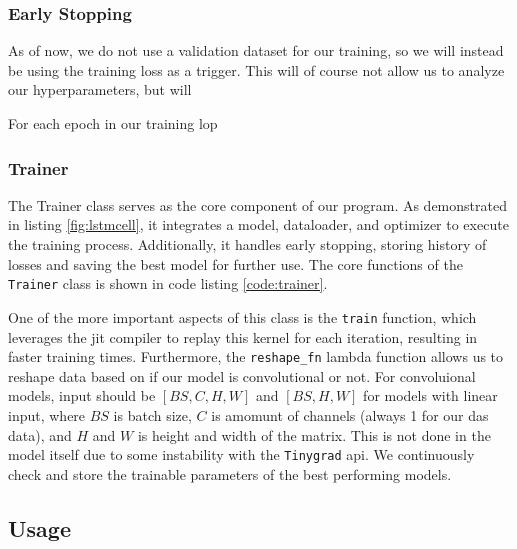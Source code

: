 

\subsubsection{Early Stopping}

As of now, we do not use a validation dataset for our training, so we will instead be using the training loss as a trigger. This will of course not allow us to analyze our hyperparameters, but will 



For each epoch in our training lop

\subsubsection{Trainer}

The Trainer class serves as the core component of our program. As demonstrated in listing \ref{fig:lstmcell}, it integrates a model, dataloader, and optimizer to execute the training process. Additionally, it handles early stopping, storing history of losses and saving the best model for further use. The core functions of the \texttt{Trainer} class is shown in code listing \ref{code:trainer}.



One of the more important aspects of this class is the \texttt{train} function, which leverages the \acrshort{jit} compiler to replay this kernel for each iteration, resulting in faster training times. Furthermore, the \texttt{reshape\_fn} lambda function allows us to reshape data based on if our model is convolutional or not. For convoluional models, input should be $[BS, C, H, W]$ and $[BS, H, W]$ for models with linear input, where $BS$ is batch size, $C$ is amomunt of channels (always 1 for our \acrshort{das} data), and $H$ and $W$ is height and width of the matrix. This is not done in the model itself due to some instability with the \texttt{Tinygrad} \acrshort{api}. We continuously check and store the trainable parameters of the best performing models.


\subsection{Usage}

